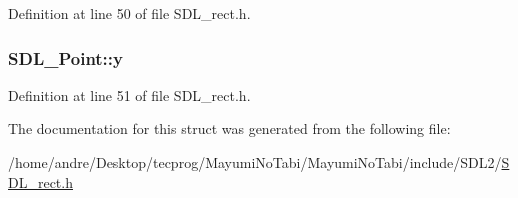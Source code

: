 Definition at line 50 of file S\-D\-L\-\_\-rect.\-h.

\hypertarget{struct_s_d_l___point_aaa68aefa869f6bdf46367a70bd9414b0}{
\subsubsection[{y}]{ S\-D\-L\-\_\-\-Point\-::y}}\label{struct_s_d_l___point_aaa68aefa869f6bdf46367a70bd9414b0}


Definition at line 51 of file S\-D\-L\-\_\-rect.\-h.



The documentation for this struct was generated from the following file\-:\begin{DoxyCompactItemize}
\item 
/home/andre/\-Desktop/tecprog/\-Mayumi\-No\-Tabi/\-Mayumi\-No\-Tabi/include/\-S\-D\-L2/\hyperlink{_s_d_l__rect_8h}{S\-D\-L\-\_\-rect.\-h}\end{DoxyCompactItemize}
